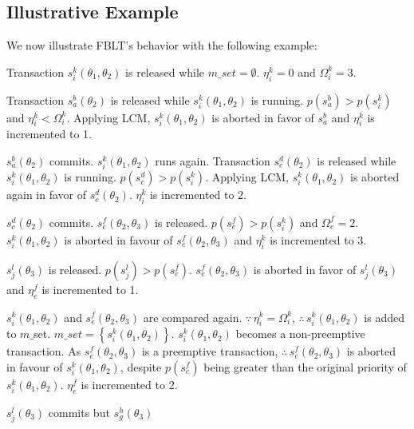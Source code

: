 \subsection{Illustrative Example}\label{subsec:fblt_example}
%
We now illustrate FBLT's behavior with the following example:
\begin{compactenum}
\item Transaction $s_{i}^{k}(\theta_{1},\theta_{2})$ is released while
$m\_set=\emptyset$. $\eta_{i}^{k}=0$ and $\Omega_{i}^{k}=3$.
\item \label{fblt_ex_step 2} Transaction $s_{a}^{b}(\theta_{2})$ is released
while $s_{i}^{k}(\theta_{1},\theta_{2})$ is running. $p(s_{a}^{b})>p(s_{i}^{k})$
and $\eta_{i}^{k}<\Omega_{i}^{k}$. Applying LCM, $s_{i}^{k}(\theta_{1},\theta_{2})$
is aborted in favor of $s_{a}^{b}$ and $\eta_{i}^{k}$ is incremented
to 1.
\item $s_{a}^{b}(\theta_{2})$ commits. $s_{i}^{k}(\theta_{1},\theta_{2})$
runs again. Transaction $s_{c}^{d}(\theta_{2})$ is released while
$s_{i}^{k}(\theta_{1},\theta_{2})$ is running. $p(s_{c}^{d})>p(s_{i}^{k})$. Applying LCM, $s_{i}^{k}(\theta_{1},\theta_{2})$ is aborted again in favor of $s_{c}^{d}(\theta_{2})$.
$\eta_{i}^{k}$ is incremented to 2.
\item $s_{c}^{d}(\theta_{2})$ commits. $s_{e}^{f}(\theta_{2},\theta_{3})$
is released. $p(s_{e}^{f})>p(s_{i}^{k})$ and $\Omega_{e}^{f}=2$. $s_{i}^{k}(\theta_{1},\theta_{2})$
is aborted in favour of $s_{e}^{f}(\theta_{2},\theta_{3})$ and $\eta_{i}^{k}$
is incremented to 3.
\item $s_{j}^{l}(\theta_{3})$ is released. $p(s_{j}^{l})>p(s_{e}^{f})$. $s_{e}^{f}(\theta_{2},\theta_{3})$ is aborted in favor of $s_{j}^{l}(\theta_{3})$
and $\eta_{e}^{f}$ is incremented to 1.
\item \label{fblt_ex_step 6} $s_{i}^{k}(\theta_{1},\theta_{2})$ and $s_{e}^{f}(\theta_{2},\theta_{3})$
are compared again. $\because\,\eta_{i}^{k}=\Omega_{i}^{k}$, $\therefore\, s_{i}^{k}(\theta_{1},\theta_{2})$
is added to $m\_$set. $m\_set=\left\{ s_{i}^{k}(\theta_{1},\theta_{2})\right\} $.
$s_{i}^{k}(\theta_{1},\theta_{2})$ becomes a non-preemptive transaction.
As $s_{e}^{f}(\theta_{2},\theta_{3})$ is a preemptive transaction, $\therefore\, s_{e}^{f}(\theta_{2},\theta_{3})$ is aborted in
favour of $s_{i}^{k}(\theta_{1},\theta_{2})$, despite $p(s_{e}^{f})$ being greater than the original priority of $s_i^k(\theta_1,\theta_2)$. $\eta_{e}^{f}$ is incremented to 2.
%
\item \label{fblt_ex_step 7} $s_{j}^{l}(\theta_{3})$ commits but $s_{g}^{h}(\theta_{3})$

\end{compactenum}
